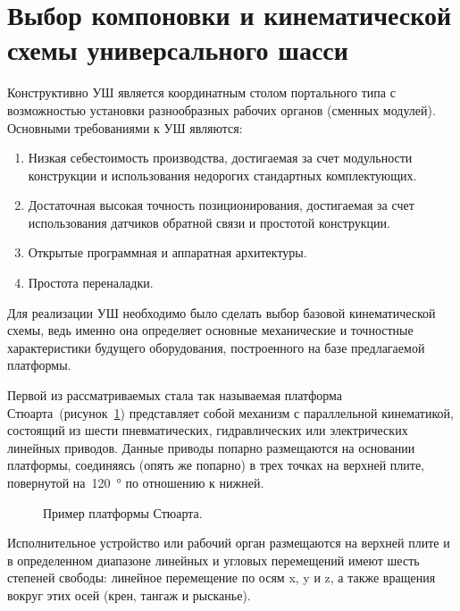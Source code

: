 \section{Выбор компоновки и кинематической схемы универсального шасси}

Конструктивно УШ является координатным столом портального типа с возможностью установки разнообразных рабочих органов (сменных модулей). Основными требованиями к УШ являются:

\begin{enumerate}
	\item Низкая себестоимость производства, достигаемая за счет модульности конструкции и использования недорогих стандартных комплектующих.
	\item Достаточная высокая точность позиционирования, достигаемая за счет использования датчиков обратной связи и простотой конструкции.
	\item Открытые программная и аппаратная архитектуры.
	\item Простота переналадки.
\end{enumerate}

Для реализации УШ необходимо было сделать выбор базовой кинематической схемы, ведь именно она определяет основные механические и точностные характеристики будущего оборудования, построенного на базе предлагаемой платформы.

Первой из рассматриваемых стала так называемая платформа Стюарта~(рисунок~\cref{fig:stuart}) представляет собой механизм с параллельной кинематикой, состоящий из шести пневматических, гидравлических или электрических линейных приводов. Данные приводы попарно размещаются на основании платформы, соединяясь (опять же попарно) в трех точках на верхней плите, повернутой на~\SI{120}{\degree} по отношению к нижней.

\begin{figure}[ht]
	\caption{Пример платформы Стюарта.}\label{fig:stuart}
\end{figure}

Исполнительное устройство или рабочий орган размещаются на верхней плите и в определенном диапазоне линейных и угловых перемещений имеют шесть степеней свободы: линейное перемещение по осям x, y и z, а также вращения вокруг этих осей (крен, тангаж и рысканье).

